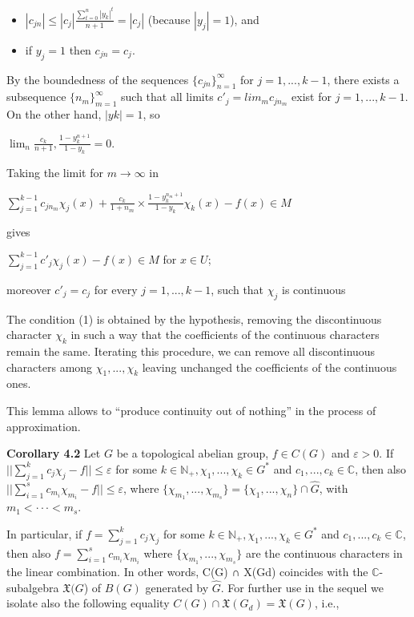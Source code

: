 \documentclass[12pt]{article}
\begin{document}
\begin{itemize}

    \item $|c_{jn}| \leqslant |c_j| \frac{\sum^{n}_{t=0} |y_k|^t}{n+1} = |c_j|$ (because $|y_j| = 1$), and

    \item if $y_j = 1$ then $c_{jn} = c_j$.

\end{itemize}


By the boundedness of the sequences $\{c_{jn}\}^{\infty}_{n=1}$ for $j = 1,...,k - 1$, there exists a subsequence $\{n_m\}^{\infty}_{m=1}$ such that all limits
$c'_j = lim_m c_{jn_m}$ exist for $j = 1,...,k - 1$. On the other hand, $|yk| = 1$, so

    $\lim_{n} \frac{c_k}{n+1}, \frac{1-y^{n+1}_k}{1-y_k} = 0$.


Taking the limit for $m \to \infty$ in


    $\sum_{j=1}^{k-1} c_{jn_m} \chi_j(x) + \frac{c_k}{1+n_m} \times \frac{1-y^{n_m + 1}_{k}}{1 - y_k} \chi_k (x) - f(x) \in M$


gives


    $\sum_{j=1}^{k-1} c'_j \chi_j (x) - f(x) \in M$ for $x \in U$;


moreover $c'_j = c_j$ for every $j = 1,...,k - 1$, such that $\chi_j$ is continuous


    The condition (1) is obtained by the hypothesis, removing the discontinuous character $\chi_k$ in such a way that the coefficients
of the continuous characters remain the same. Iterating this procedure, we can remove all discontinuous characters
among $\chi_1,...,\chi_k$ leaving unchanged the coefficients of the continuous ones.


    This lemma allows to “produce continuity out of nothing” in the process of approximation.


\textbf{Corollary 4.2} Let $G$ be a topological abelian group, $f \in C(G)$ and $\varepsilon > 0$. If $||\sum^{k}_{j=1} c_j \chi_j - f || \leqslant \varepsilon$ for some $k \in \mathbb{N}_+, \chi_1,...,\chi_k \in G^*$
and $c_1,..., c_k \in \mathbb{C}$, then also $|| \sum^{s}_{i=1} c_{m_i} \chi_{m_i} - f || \leqslant \varepsilon$, where $\{\chi_{m_1} ,...,\chi_{m_s} \} = \{\chi_1,...,\chi_n\} \cap \widehat{G}$, with $m_1 < ··· < m_s$.


    In particular, if $f = \sum^{k}_{j=1} c_j \chi_j$ for some $k \in \mathbb{N}_+, \chi_1,...,\chi_k \in G^*$ and $c_1,..., c_k \in \mathbb{C}$, then also $f = \sum^{s}_{i=1} c_{m_i} \chi_{m_i}$ where
$\{\chi_{m_1} ,...,\chi_{m_s}\}$ are the continuous characters in the linear combination. In other words, C(G) ∩ X(Gd) coincides with the
$\mathbb{C}$-subalgebra $\mathfrak{X}(G$) of $B(G)$ generated by $\widehat{G}$. For further use in the sequel we isolate also the following equality
$C(G) \cap \mathfrak{X}(G_d) = \mathfrak{X}(G)$, i.e.,
\end{document}

